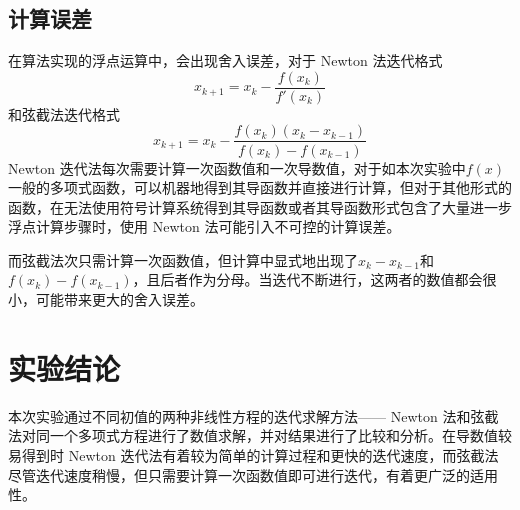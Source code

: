\documentclass[11pt]{article}
\begin{document}
\subsection{计算误差}
在算法实现的浮点运算中，会出现舍入误差，对于 Newton 法迭代格式
\begin{equation}
    x_{k + 1} = x_k - \frac{f(x_k)}{f'(x_k)} \tag{6}
\end{equation}
和弦截法迭代格式
\begin{equation*}
    x_{k + 1} = x_k - \frac{f(x_k)(x_k - x_{k - 1})}{f(x_k) - f(x_{k - 1})} \tag{1}
\end{equation*}
Newton 迭代法每次需要计算一次函数值和一次导数值，对于如本次实验中$f(x)$一般的多项式函数，可以机器地得到其导函数并直接进行计算，但对于其他形式的函数，在无法使用符号计算系统得到其导函数或者其导函数形式包含了大量进一步浮点计算步骤时，使用 Newton 法可能引入不可控的计算误差。

而弦截法次只需计算一次函数值，但计算中显式地出现了$x_k - x_{k - 1}$和$f(x_k) - f(x_{k - 1})$，且后者作为分母。当迭代不断进行，这两者的数值都会很小，可能带来更大的舍入误差。

\section{实验结论}
本次实验通过不同初值的两种非线性方程的迭代求解方法—— Newton 法和弦截法对同一个多项式方程进行了数值求解，并对结果进行了比较和分析。在导数值较易得到时 Newton 迭代法有着较为简单的计算过程和更快的迭代速度，而弦截法尽管迭代速度稍慢，但只需要计算一次函数值即可进行迭代，有着更广泛的适用性。
\end{document}
